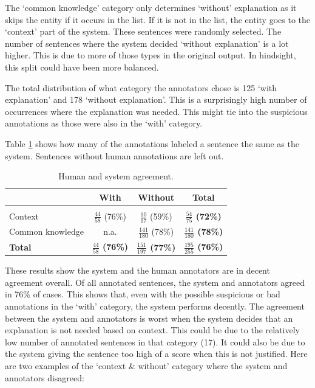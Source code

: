 \documentclass[
10pt, %
a4paper, %
oneside, %
headinclude,footinclude, %
] {book}%
\begin{document}
The `common knowledge' category only determines `without' explanation as it skips the entity if it occurs in the list.
If it is not in the list, the entity goes to the `context' part of the system.
These sentences were randomly selected.
The number of sentences where the system decided `without explanation' is a lot higher. 
This is due to more of those types in the original output.
In hindsight, this split could have been more balanced.

The total distribution of what category the annotators chose is 125 `with explanation' and 178 `without explanation'.
This is a surprisingly high number of occurrences where the explanation was needed.
This might tie into the suspicious annotations as those were also in the `with' category.

Table \ref{table:agreement} shows how many of the annotations labeled a sentence the same as the system.
Sentences without human annotations are left out.

\begin{table}[hbtp]\centering
  \caption{Human and system agreement.\label{table:agreement}}
  \begin{tabular}{l|ccc}
                     & With                                & Without                               & \textbf{Total}                          \\
    \hline                                                                                                                                   \\
    Context          & \( \frac{44}{58} \) (76\%)          & \( \frac{10}{17} \) (59\%)            & \textbf{\( \frac{54}{75} \) (72\%)}     \\[5pt]
    Common knowledge & n.a.                                & \( \frac{141}{180} \) (78\%)          & \textbf{\( \frac{141}{180} \) (78\%)}   \\[5pt]
    \textbf{Total}   & \textbf{\( \frac{44}{58} \) (76\%)} & \textbf{\( \frac{151}{197} \) (77\%)} & \textbf{ \( \frac{195}{255} \)  (76\%)} \\
  \end{tabular}
\end{table}

These results show the system and the human annotators are in decent agreement overall.
Of all annotated sentences, the system and annotators agreed in 76\% of cases.
This shows that, even with the possible suspicious or bad annotations in the `with' category, the system performs decently.
The agreement between the system and annotators is worst when the system decides that an explanation is not needed based on context.
This could be due to the relatively low number of annotated sentences in that category (17).
It could also be due to the system giving the sentence too high of a score when this is not justified.
Here are two examples of the `context \& without' category where the system and annotators disagreed:
\end{document}
